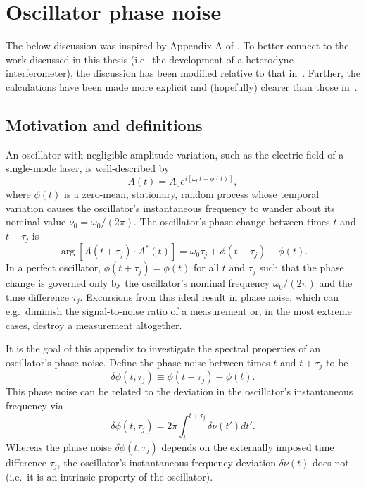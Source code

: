 \chapter{Oscillator phase noise}
\label{app:OscillatorPhaseNoise}
The below discussion was inspired by Appendix A of
\cite{stephan_pra05}.
To better connect to the work discussed in this thesis
(i.e.\ the development of a heterodyne interferometer),
the discussion has been modified relative to that in~\cite{stephan_pra05}.
Further, the calculations have been made more explicit and
(hopefully) clearer than those in~\cite{stephan_pra05}.


\section{Motivation and definitions}
An oscillator with negligible amplitude variation,
such as the electric field of a single-mode laser,
is well-described by
\begin{equation}
  A(t) = A_0 e^{i [\omega_0 t + \phi(t)]},
\end{equation}
where $\phi(t)$ is a zero-mean, stationary, random process
whose temporal variation causes
the oscillator's instantaneous frequency
to wander about its nominal value $\nu_0 = \omega_0 / (2 \pi)$.
The oscillator's phase change between
times $t$ and $t + \tau_j$ is
\begin{equation}
  \arg[A(t + \tau_j) \cdot A^*(t)]
  =
  \omega_0 \tau_j + \phi(t + \tau_j) - \phi(t).
\end{equation}
In a perfect oscillator,
$\phi(t + \tau_j) = \phi(t)$ for all $t$ and $\tau_j$
such that the phase change is governed only by
the oscillator's nominal frequency $\omega_0 / (2 \pi)$ and
the time difference $\tau_j$.
Excursions from this ideal result in phase noise, which can e.g.\
diminish the signal-to-noise ratio of a measurement or,
in the most extreme cases, destroy a measurement altogether.

It is the goal of this appendix
to investigate the spectral properties
of an oscillator's phase noise.
Define the phase noise between times $t$ and $t + \tau_j$ to be
\begin{equation}
  \delta \phi(t, \tau_j)
  \equiv
  \phi(t + \tau_j) - \phi(t).
\end{equation}
This phase noise can be related to
the deviation in the oscillator's instantaneous frequency via
\begin{equation}
  \delta \phi(t, \tau_j)
  =
  2 \pi \int_{t}^{t + \tau_j} \delta \nu(t') dt'.
  \label{eq:OscillatorPhaseNoise:phase_noise_from_frequency_deviation}
\end{equation}
Whereas the phase noise $\delta \phi(t, \tau_j)$
depends on the externally imposed time difference $\tau_j$,
the oscillator's instantaneous frequency deviation $\delta \nu(t)$ does not
(i.e.\ it is an intrinsic property of the oscillator).


